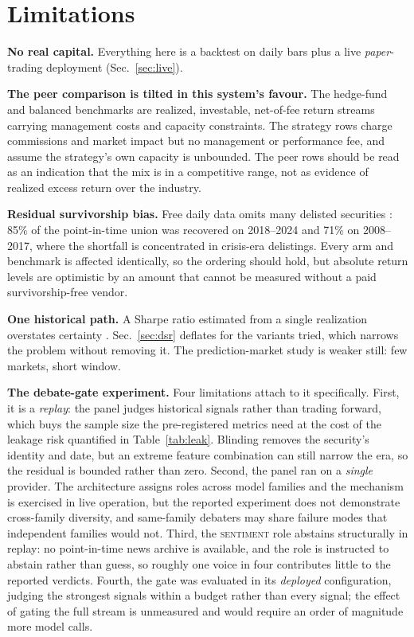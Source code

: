 \documentclass[10pt,twocolumn]{IEEEtran}
\begin{document}
\section{Limitations}
\label{sec:limits}

\textbf{No real capital.} Everything here is a backtest on daily bars plus a
live \emph{paper}-trading deployment (Sec.~\ref{sec:live}).

\textbf{The peer comparison is tilted in this system's favour.} The hedge-fund
and balanced benchmarks are realized, investable, net-of-fee return streams
carrying management costs and capacity constraints. The strategy rows charge
commissions and market impact but no management or performance fee, and assume
the strategy's own capacity is unbounded. The peer rows should be read as an
indication that the mix is in a competitive range, not as evidence of realized
excess return over the industry.

\textbf{Residual survivorship bias.} Free daily data omits many delisted
securities \cite{shumway1997delisting}: 85\% of the point-in-time union was
recovered on 2018--2024 and 71\% on 2008--2017, where the shortfall is
concentrated in crisis-era delistings. Every arm and benchmark is affected
identically, so the ordering should hold, but absolute return levels are
optimistic by an amount that cannot be measured without a paid
survivorship-free vendor.

\textbf{One historical path.} A Sharpe ratio estimated from a single
realization overstates certainty \cite{bailey2014deflated,lo2002statistics}.
Sec.~\ref{sec:dsr} deflates for the variants tried, which narrows the problem
without removing it. The prediction-market study is weaker still: few markets,
short window.

\textbf{The debate-gate experiment.} Four limitations attach to it
specifically. First, it is a \emph{replay}: the panel judges
historical signals rather than trading forward, which buys the sample size the
pre-registered metrics need at the cost of the leakage risk quantified in
Table~\ref{tab:leak}. Blinding removes the security's identity and date, but
an extreme feature combination can still narrow the era, so the residual is
bounded rather than zero. Second, the panel ran on a \emph{single} provider.
The architecture assigns roles across model families and the mechanism is
exercised in live operation, but the reported experiment does not demonstrate
cross-family diversity, and same-family debaters may share failure modes that
independent families would not. Third, the \textsc{sentiment} role abstains
structurally in replay: no point-in-time news archive is available, and the
role is instructed to abstain rather than guess, so roughly one voice in four
contributes little to the reported verdicts. Fourth, the gate was evaluated in
its \emph{deployed} configuration, judging the strongest signals within a
budget rather than every signal; the effect of gating the full stream is
unmeasured and would require an order of magnitude more model calls.
\end{document}
